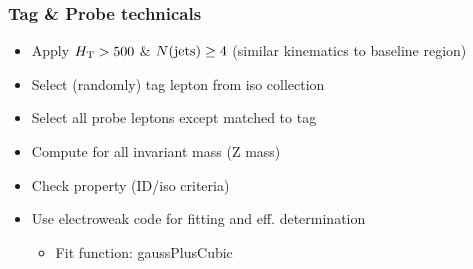 \documentclass{beamer}
\begin{document}
\begin{frame}
 \frametitle{Tag \& Probe technicals}
 \begin{itemize}
 \item Apply $H_{\text{T}}>500$ \& $N(\text{jets})\geq4$ (similar kinematics to baseline region)
  \item Select (randomly) tag lepton from iso collection
  \item Select all probe leptons except matched to tag
  \item Compute for all invariant mass (Z mass)
  \item Check property (ID/iso criteria)
  \item Use electroweak code for fitting and eff. determination
  \begin{itemize}
   \item Fit function: gaussPlusCubic
  \end{itemize}

 \end{itemize}

\end{frame}
\end{document}
